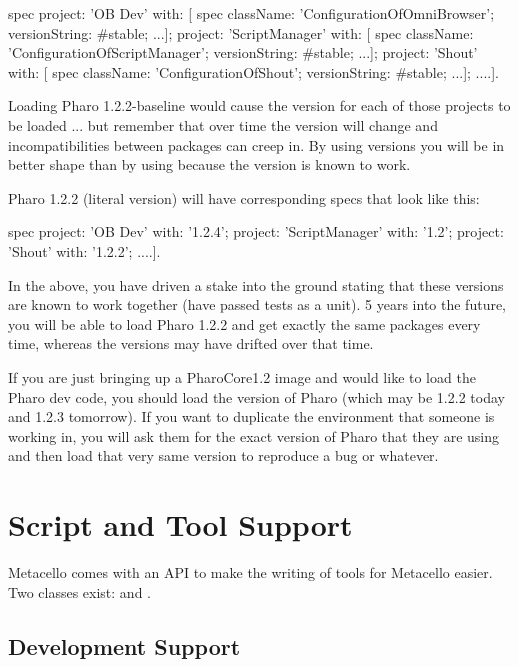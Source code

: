\documentclass[a4paper,10pt,twoside]{book}
\begin{document}
\begin{code}{}
 spec
    project: 'OB Dev' with: [
      spec
         className: 'ConfigurationOfOmniBrowser';
         versionString: #stable;
         ...];
    project: 'ScriptManager' with: [
      spec
         className: 'ConfigurationOfScriptManager';
         versionString: #stable;
         ...];
    project: 'Shout' with: [
      spec
         className: 'ConfigurationOfShout';
         versionString: #stable;
         ...];
    ....].

Loading Pharo 1.2.2-baseline would cause the  version for each of those projects to be loaded ... 
but remember that over time the  version will change and incompatibilities between packages can creep in. 
By using  versions you will be in better shape than by using  because the  version is known to work.

Pharo 1.2.2 (literal version) will have corresponding specs that look like this:

\begin{code}{}
 spec
    project: 'OB Dev' with: '1.2.4';
    project: 'ScriptManager' with: '1.2';
    project: 'Shout' with: '1.2.2';
    ....].

In the above, you have driven a stake into the ground stating that these versions are known to work together (have passed tests as a unit). 5 years into the future, you will be able to load Pharo 1.2.2 and get exactly the same packages every time, whereas the  versions may have drifted over that time.

If you are just bringing up a PharoCore1.2 image and would like to load the Pharo dev code, you should load the  version of Pharo (which may be 1.2.2 today and 1.2.3 tomorrow).
If you want to duplicate the environment that someone is working in, you will ask them for the exact version of Pharo that they are using and then load that very same version to reproduce a  bug or whatever. 


\section{Script and Tool Support}
Metacello comes with an API to make the writing of tools for Metacello easier. Two classes exist:  and . 

\subsection{Development Support}


\end{code}
\end{code}
\end{document}
